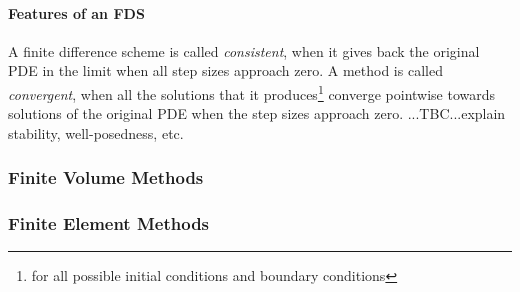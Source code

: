 
\paragraph{Features of an FDS}
A finite difference scheme is called \emph{consistent}, when it gives back the original PDE in the limit when all step sizes approach zero. A method is called \emph{convergent}, when all the solutions that it produces\footnote{for all possible initial conditions and boundary conditions} converge pointwise towards solutions of the original PDE when the step sizes approach zero. ...TBC...explain stability, well-posedness, etc.




\subsubsection{Finite Volume Methods}

\subsubsection{Finite Element Methods}



